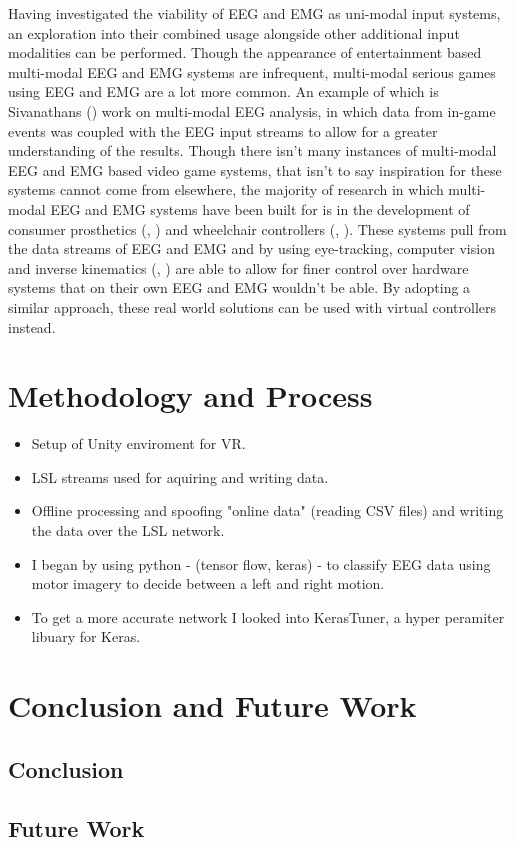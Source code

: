 \documentclass[11pt, a4paper]{article}
\newcommand{\ccite}[1]{(\citeauthor{#1}, \citeyear{#1})}
\newcommand{\cciteyear}[1]{(\citeyear{#1})}
\begin{document}
\hfill
  
Having investigated the viability of EEG and EMG as uni-modal input systems, an exploration into their combined usage alongside other additional input modalities can be performed. Though the appearance of entertainment based multi-modal EEG and EMG systems are infrequent, multi-modal serious games using EEG and EMG are a lot more common. An example of which is Sivanathans \cciteyear{sivanathan2014temporal} work on multi-modal EEG analysis, in which data from in-game events was coupled with the EEG input streams to allow for a greater understanding of the results. Though there isn't many instances of multi-modal EEG and EMG based video game systems, that isn't to say inspiration for these systems cannot come from elsewhere, the majority of research in which multi-modal EEG and EMG systems have been built for is in the development of consumer prosthetics \ccite{shi2019novel} and wheelchair controllers \ccite{carlson2013brain}. These systems pull from the data streams of EEG and EMG and by using eye-tracking, computer vision and inverse kinematics \ccite{mcmullen2013demonstration} are able to allow for finer control over hardware systems that on their own EEG and EMG wouldn't be able. By adopting a similar approach, these real world solutions can be used with virtual controllers instead. 


\pagebreak
\section{Methodology and Process}			%

\begin{itemize}
  \item Setup of Unity enviroment for VR.
  \item LSL streams used for aquiring and writing data.
  \item Offline processing and spoofing "online data" (reading CSV files) and writing the data over the LSL network.
  \item I began by using python - (tensor flow, keras) - to classify EEG data using motor imagery to decide between a left and right motion.
  \item To get a more accurate network I looked into KerasTuner, a hyper peramiter libuary for Keras.
\end{itemize}


\pagebreak
\section{Conclusion and Future Work}

\subsection{Conclusion}

\subsection{Future Work}			%




\pagebreak
\printbibliography
\end{document}
